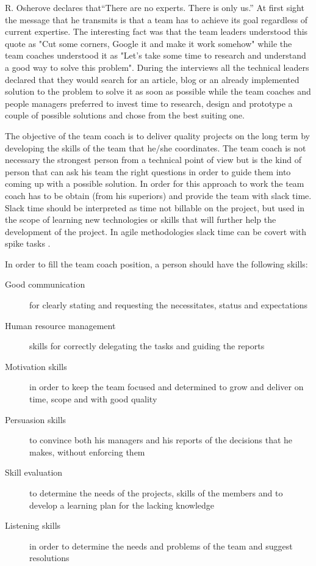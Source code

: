 R. Osherove \cite{notes-to-a-software-team-leader} declares that``There are no experts. There is only us.'' At first sight the message that he transmits is that a team has to achieve its goal regardless of current expertise. The interesting fact was that the team leaders understood this quote as "Cut some corners, Google it and make it work somehow" while the team coaches understood it as "Let's take some time to research and understand a good way to solve this problem". During the interviews all the technical leaders declared that they would search for an article, blog or an already implemented solution to the problem to solve it as soon as possible while the team coaches and people managers preferred to invest time to research, design and prototype a couple of possible solutions and chose from the best suiting one.

The objective of the team coach is to deliver quality projects on the long term by developing the skills of the team that he/she coordinates. The team coach is not necessary the strongest person from a technical point of view but is the kind of person that can ask his team the right questions in order to guide them into coming up with a possible solution.  In order for this approach to work the team coach has to be obtain (from his superiors) and provide the team with slack time. Slack time should be interpreted as time not billable on the project, but used in the scope of learning new technologies or skills that will further help the development of the project. In agile methodologies slack time can be covert with spike tasks \cite{spike}.

In order to fill the team coach position, a person should have the following skills:
\begin{description}
\item [Good communication] for clearly stating and requesting the necessitates, status and expectations
\item [Human resource management] skills for correctly delegating the tasks and guiding the reports
\item [Motivation skills] in order to keep the team focused and determined to grow and deliver on time, scope and with good quality
\item [Persuasion skills] to convince both his managers and his reports of the decisions that he makes, without enforcing them
\item [Skill evaluation] to determine the needs of the projects, skills of the members and to develop a learning plan for the lacking knowledge
\item [Listening skills] in order to determine the needs and problems of the team and suggest resolutions
\end{description}

